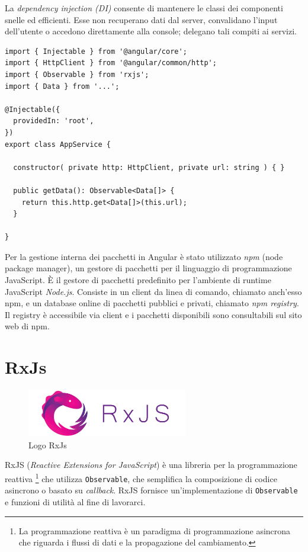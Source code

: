 La \textit{dependency injection (DI)} consente di mantenere le classi dei componenti snelle ed efficienti. Esse non recuperano dati dal server, convalidano l'input dell'utente o accedono direttamente alla console; delegano tali compiti ai servizi. \cite{ANGULAR}
\begin{lstlisting}[caption={Esempio di un Service in Angular}, style=javaScriptCode]
import { Injectable } from '@angular/core';
import { HttpClient } from '@angular/common/http';
import { Observable } from 'rxjs';
import { Data } from '...';

@Injectable({
  providedIn: 'root',
})
export class AppService {

  constructor( private http: HttpClient, private url: string ) { }
  
  public getData(): Observable<Data[]> {
    return this.http.get<Data[]>(this.url);
  }

}
\end{lstlisting}
Per la gestione interna dei pacchetti in Angular è stato utilizzato \textit{npm} (node package manager), un gestore di pacchetti per il linguaggio di programmazione JavaScript. È il gestore di pacchetti predefinito per l'ambiente di runtime JavaScript \textit{Node.js}. Consiste in un client da linea di comando, chiamato anch'esso npm, e un database online di pacchetti pubblici e privati, chiamato \textit{npm registry}.
Il registry è accessibile via client e i pacchetti disponibili sono consultabili sul sito web di npm. \cite{NPM}

\section{RxJs}
\begin{figure}[h!]
\begin{center}
  \includegraphics[width=7cm]{images/RxJs.png}
  \caption{Logo RxJs}
\end{center}
\end{figure}
RxJS (\textit{Reactive Extensions for JavaScript}) è una libreria per la programmazione reattiva \footnote{La programmazione reattiva è un paradigma di programmazione asincrona che riguarda i flussi di dati e la propagazione del cambiamento.} che utilizza \verb|Observable|, che semplifica la composizione di codice asincrono o basato su \textit{callback}. RxJS fornisce un'implementazione di \verb|Observable| e funzioni di utilità al fine di lavorarci. \cite{RxJS} 

